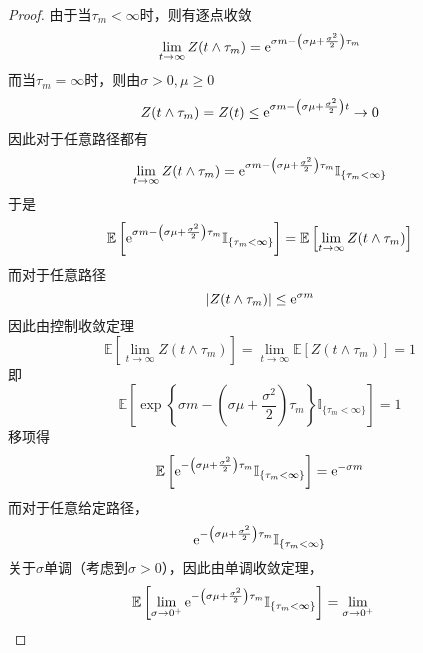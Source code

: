 \documentclass[cn]{homework}
\newcommand{\E}{\mathbb E}
\begin{document}
\begin{subproblem}
        \item
        \label{subp:laplace}
        \begin{proof}
            由于当$\tau_m<\infty$时，则有逐点收敛
            \[\lim_{t\to\infty}Z(t\land\tau_m)
            =\mathrm e^{\sigma m-\left(\sigma\mu+\frac{\sigma^2}{2}\right)\tau_m}\]
            而当$\tau_m=\infty$时，则由$\sigma> 0,\mu\geq 0$
            \begin{equation}
                \label{eq:tau infty to 0}
                Z(t\land\tau_m)=Z(t)\leq
                \mathrm e^{\sigma m-\left(\sigma\mu+\frac{\sigma^2}{2}\right)t}
                \to 0
            \end{equation}
            因此对于任意路径都有
            \[\lim_{t\to\infty}Z(t\land\tau_m)
            =\mathrm e^{\sigma m-\left(\sigma\mu+\frac{\sigma^2}{2}\right)\tau_m}
            \mathbb I_{\{\tau_m<\infty\}}\]
            于是
            \[\E\left[
            \e^{\sigma m-\left(\sigma\mu+\frac{\sigma^2}{2}\right)\tau_m}
            \mathbb I_{\{\tau_m<\infty\}}\right]
            =\E\left[\lim_{t\to\infty}Z(t\land\tau_m)\right]\]
            而对于任意路径
            \begin{equation}
                \label{eq:control}
                |Z(t\land\tau_m)|\leq\mathrm e^{\sigma m}
            \end{equation}
            因此由控制收敛定理
            \[\E\left[\lim_{t\to\infty}Z(t\land\tau_m)\right]
            =\lim_{t\to\infty}\E[Z(t\land\tau_m)]=1\]
            即
            \[\E\left[
                \exp\left\{
                    \sigma m-\left(\sigma\mu+\frac{\sigma^2}{2}\right)\tau_m
                    \right\}
                \mathbb I_{\{\tau_m<\infty\}}
            \right]=1\]
            移项得
            \begin{equation}
                \label{eq:laplace}
                \E\left[\e^{-\left(\sigma\mu+\frac{\sigma^2}{2}\right)\tau_m}
                \mathbb I_{\{\tau_m<\infty\}}\right]
                =\e^{-\sigma m}
            \end{equation}
            而对于任意给定路径，
            \[\mathrm e^{-\left(\sigma\mu+\frac{\sigma^2}{2}\right)\tau_m}
            \mathbb I_{\{\tau_m<\infty\}}\]
            关于$\sigma$单调（考虑到$\sigma>0$），因此由单调收敛定理，
            \[\begin{aligned}
                \E\left[
                \lim_{\sigma\to0^+}
                \e^{-\left(\sigma\mu+\frac{\sigma^2}{2}\right)\tau_m}
                \mathbb I_{\{\tau_m<\infty\}}
            \right]&=
            \lim_{\sigma\to0^+}

\end{aligned}\]
\end{proof}
\end{subproblem}
\end{document}
